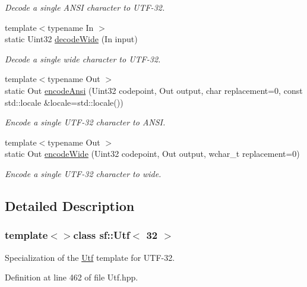 \begin{DoxyCompactItemize}
\begin{DoxyCompactList}\small\item\em Decode a single A\-N\-S\-I character to U\-T\-F-\/32. \end{DoxyCompactList}\item 
{\footnotesize template$<$typename In $>$ }\\static Uint32 \hyperlink{classsf_1_1Utf_3_0132_01_4_a043fe25f5f4dbc205e78e6f1d99840dc}{decode\-Wide} (In input)
\begin{DoxyCompactList}\small\item\em Decode a single wide character to U\-T\-F-\/32. \end{DoxyCompactList}\item 
{\footnotesize template$<$typename Out $>$ }\\static Out \hyperlink{classsf_1_1Utf_3_0132_01_4_af6590226a071076ca22d818573a16ded}{encode\-Ansi} (Uint32 codepoint, Out output, char replacement=0, const std\-::locale \&locale=std\-::locale())
\begin{DoxyCompactList}\small\item\em Encode a single U\-T\-F-\/32 character to A\-N\-S\-I. \end{DoxyCompactList}\item 
{\footnotesize template$<$typename Out $>$ }\\static Out \hyperlink{classsf_1_1Utf_3_0132_01_4_a52e511e74ddc5df1bbf18f910193bc47}{encode\-Wide} (Uint32 codepoint, Out output, wchar\-\_\-t replacement=0)
\begin{DoxyCompactList}\small\item\em Encode a single U\-T\-F-\/32 character to wide. \end{DoxyCompactList}\end{DoxyCompactItemize}


\subsection{Detailed Description}
\subsubsection*{template$<$$>$class sf\-::\-Utf$<$ 32 $>$}

Specialization of the \hyperlink{classsf_1_1Utf}{Utf} template for U\-T\-F-\/32. 

Definition at line 462 of file Utf.\-hpp.



